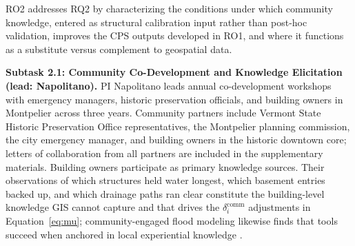 \documentclass[11pt]{article}
\begin{document}
RO2 addresses RQ2 by characterizing the conditions under which community knowledge,
entered as structural calibration input rather than post-hoc validation, improves
the CPS outputs developed in RO1, and where it functions as a substitute versus
complement to geospatial data.

\textbf{Subtask 2.1: Community Co-Development and Knowledge Elicitation
(lead: Napolitano).}
PI Napolitano leads annual co-development workshops with emergency managers, historic
preservation officials, and building owners in Montpelier across three years.
Community partners include Vermont State Historic Preservation Office representatives,
the Montpelier planning commission, the city emergency manager, and building owners
in the historic downtown core; letters of collaboration from all partners are included
in the supplementary materials.
Building owners participate as primary knowledge sources. Their observations of which structures held water longest, which basement entries backed up, and which drainage paths ran clear constitute the building-level knowledge GIS cannot capture and that drives the $\delta_i^{\mathrm{comm}}$ adjustments in Equation~\eqref{eq:mu}; community-engaged flood modeling likewise finds that tools succeed when anchored in local experiential knowledge \cite{skilton2022dontwant,habib2026sustaining}.
\end{document}
